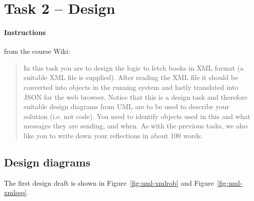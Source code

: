 %
%
%
%


\section{Task 2 -- Design}\label{task-2}

\paragraph{Instructions}\label{task-2-instructions}
from the course Wiki\cite{1dv600:lab2:instructions}:

\begin{quote}
  In this task you are to design the logic to fetch books in XML format (a
  suitable XML file is supplied). After reading the XML file it should be
  converted into objects in the running system and lastly translated into JSON
  for the web browser.
  Notice that this is a design task and therefore suitable design diagrams from
  UML are to be used to describe your solution (i.e. not code). You need to
  identify objects used in this and what messages they are sending, and when.
  As with the previous tasks, we also like you to write down your reflections
  in about 100 words.
\end{quote}


\subsection{Design diagrams}\label{task-2-design}
The first design draft is shown in Figure~\ref{fig:uml-xmlrob} and
Figure~\ref{fig:uml-xmlseq}.

